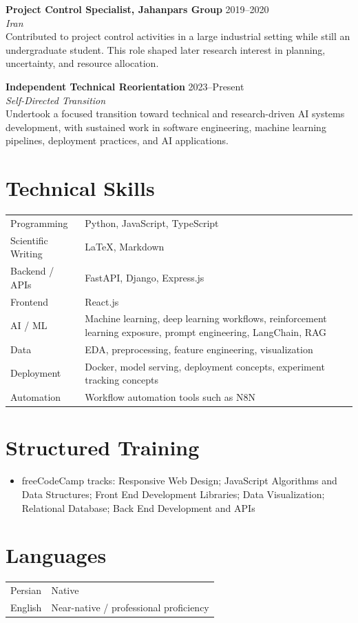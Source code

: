 \documentclass[11pt,a4paper]{article}
\newcommand{\Entry}[4]{
    \textbf{#1} \hfill {\color{gray}#2}\\
    \textit{#3}\\
    #4
    \vspace{0.8em}
}
\begin{document}
\Entry
{Project Control Specialist, Jahanpars Group}
{2019--2020}
{Iran}
{
Contributed to project control activities in a large industrial setting while still an undergraduate student.
This role shaped later research interest in planning, uncertainty, and resource allocation.
}

\Entry
{Independent Technical Reorientation}
{2023--Present}
{Self-Directed Transition}
{
Undertook a focused transition toward technical and research-driven AI systems development, with sustained work in software engineering, machine learning pipelines, deployment practices, and AI applications.
}

\section*{Technical Skills}

\begin{tabularx}{\textwidth}{@{}p{3.5cm}Y@{}}
Programming & Python, JavaScript, TypeScript \\
Scientific Writing & \LaTeX, Markdown \\
Backend / APIs & FastAPI, Django, Express.js \\
Frontend & React.js \\
AI / ML & Machine learning, deep learning workflows, reinforcement learning exposure, prompt engineering, LangChain, RAG \\
Data & EDA, preprocessing, feature engineering, visualization \\
Deployment & Docker, model serving, deployment concepts, experiment tracking concepts \\
Automation & Workflow automation tools such as N8N \\
\end{tabularx}

\section*{Structured Training}
\begin{itemize}
    \item freeCodeCamp tracks: Responsive Web Design; JavaScript Algorithms and Data Structures; Front End Development Libraries; Data Visualization; Relational Database; Back End Development and APIs
\end{itemize}

\section*{Languages}
\begin{tabularx}{\textwidth}{@{}p{3cm}Y@{}}
Persian & Native \\
English & Near-native / professional proficiency \\
\end{tabularx}
\end{document}
